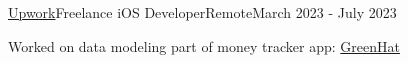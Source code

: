   \begin{resume_employer}{\href{https://www.upwork.com/freelancers/~018ad8f0c1b6c76e9c}{Upwork}}{Freelance iOS Developer}{Remote}{March 2023 - July 2023}
  
  \item Worked on data modeling part of money tracker app: {\href{https://apps.apple.com/uz/app/greenhat-hack-your-finances/id1631715042}{GreenHat}}  
 \end{resume_employer}

